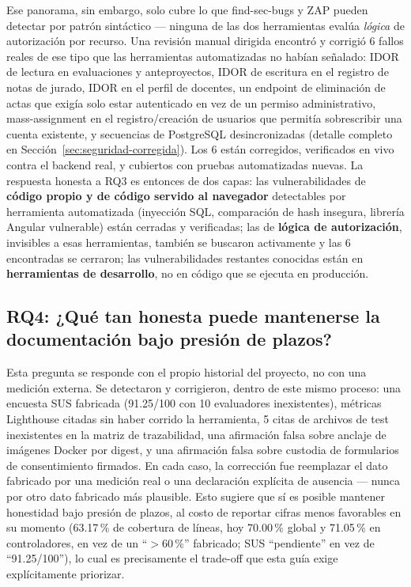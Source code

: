 Ese panorama, sin embargo, solo cubre lo que find-sec-bugs y ZAP pueden detectar por patrón sintáctico
--- ninguna de las dos herramientas evalúa \emph{lógica} de autorización por recurso. Una revisión manual
dirigida encontró y corrigió 6 fallos reales de ese tipo que las herramientas automatizadas no habían
señalado: IDOR de lectura en evaluaciones y anteproyectos, IDOR de escritura en el registro de notas de
jurado, IDOR en el perfil de docentes, un endpoint de eliminación de actas que exigía solo estar
autenticado en vez de un permiso administrativo, mass-assignment en el registro/creación de usuarios que
permitía sobrescribir una cuenta existente, y secuencias de PostgreSQL desincronizadas (detalle completo
en Sección~\ref{sec:seguridad-corregida}). Los 6 están corregidos, verificados en vivo contra el backend
real, y cubiertos con pruebas automatizadas nuevas. La respuesta honesta a RQ3 es entonces de dos capas:
las vulnerabilidades de \textbf{código propio y de código servido al navegador} detectables por
herramienta automatizada (inyección SQL, comparación de hash insegura, librería Angular vulnerable) están
cerradas y verificadas; las de \textbf{lógica de autorización}, invisibles a esas herramientas, también se
buscaron activamente y las 6 encontradas se cerraron; las vulnerabilidades restantes conocidas están en
\textbf{herramientas de desarrollo}, no en código que se ejecuta en producción.

\subsection*{RQ4: ¿Qué tan honesta puede mantenerse la documentación bajo presión de plazos?}
Esta pregunta se responde con el propio historial del proyecto, no con una medición externa. Se
detectaron y corrigieron, dentro de este mismo proceso: una encuesta SUS fabricada (91.25/100 con 10
evaluadores inexistentes), métricas Lighthouse citadas sin haber corrido la herramienta, 5 citas de
archivos de test inexistentes en la matriz de trazabilidad, una afirmación falsa sobre anclaje de
imágenes Docker por digest, y una afirmación falsa sobre custodia de formularios de consentimiento
firmados. En cada caso, la corrección fue reemplazar el dato fabricado por una medición real o una
declaración explícita de ausencia --- nunca por otro dato fabricado más plausible. Esto sugiere que sí es
posible mantener honestidad bajo presión de plazos, al costo de reportar cifras menos favorables en su
momento (63.17\,\% de cobertura de líneas, hoy 70.00\,\% global y 71.05\,\% en controladores, en
vez de un ``$>$60\,\%'' fabricado; SUS ``pendiente'' en vez de ``91.25/100''), lo cual es
precisamente el trade-off que esta guía exige explícitamente priorizar.
\newpage
